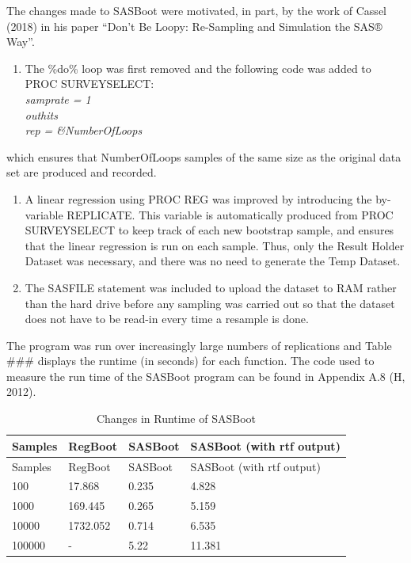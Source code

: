 \documentclass[]{article}
\providecommand{\tightlist}{%
  \setlength{\itemsep}{0pt}\setlength{\parskip}{0pt}}
\begin{document}
The changes made to SASBoot were motivated, in part, by the work of
Cassel (2018) in his paper ``Don't Be Loopy: Re-Sampling and Simulation
the SAS® Way''.

\begin{enumerate}
\def\labelenumi{\arabic{enumi}.}
\tightlist
\item
  The \%do\% loop was first removed and the following code was added to
  PROC SURVEYSELECT:\\
  \emph{samprate = 1}\\
  \emph{outhits}\\
  \emph{rep = \&NumberOfLoops}
\end{enumerate}

which ensures that NumberOfLoops samples of the same size as the
original data set are produced and recorded.

\begin{enumerate}
\def\labelenumi{\arabic{enumi}.}
\setcounter{enumi}{1}
\item
  A linear regression using PROC REG was improved by introducing the
  by-variable REPLICATE. This variable is automatically produced from
  PROC SURVEYSELECT to keep track of each new bootstrap sample, and
  ensures that the linear regression is run on each sample. Thus, only
  the Result Holder Dataset was necessary, and there was no need to
  generate the Temp Dataset.
\item
  The SASFILE statement was included to upload the dataset to RAM rather
  than the hard drive before any sampling was carried out so that the
  dataset does not have to be read-in every time a resample is done.
\end{enumerate}

The program was run over increasingly large numbers of replications and
Table \#\#\# displays the runtime (in seconds) for each function. The
code used to measure the run time of the SASBoot program can be found in
Appendix A.8 (H, 2012).

\begin{longtable}[]{@{}llll@{}}
\caption{Changes in Runtime of SASBoot}\tabularnewline
\toprule
Samples & RegBoot & SASBoot & SASBoot (with rtf output)\tabularnewline
\midrule
\endfirsthead
\toprule
Samples & RegBoot & SASBoot & SASBoot (with rtf output)\tabularnewline
\midrule
\endhead
100 & 17.868 & 0.235 & 4.828\tabularnewline
1000 & 169.445 & 0.265 & 5.159\tabularnewline
10000 & 1732.052 & 0.714 & 6.535\tabularnewline
100000 & - & 5.22 & 11.381\tabularnewline
\bottomrule
\end{longtable}
\end{document}
